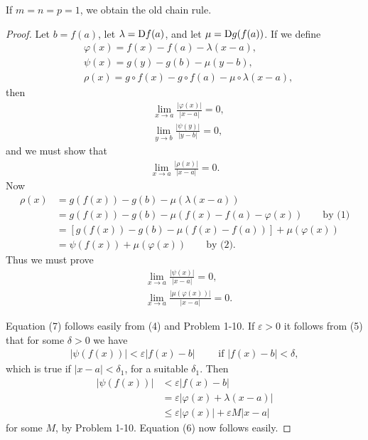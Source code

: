 If $m=n=p=1$, we obtain the old chain rule.
\begin{proof}
    Let $b = f(a)$, let $\lambda = \mathrm{D}f(a)$, and let $\mu = \mathrm{D}g(f(a))$.
    If we define 
    \begin{align}
        & \varphi(x) = f(x) - f(a) - \lambda(x-a), \\
        & \psi(x) = g(y) - g(b) - \mu(y-b),\\
        & \rho(x) = g\circ f(x) - g\circ f(a) - \mu\circ \lambda(x-a),
    \end{align}
    then 
    \begin{align}
        & \lim_{x\to a}{\frac{|\varphi(x)|}{|x-a|}} = 0,\\
        & \lim_{y\to b}{\frac{|\psi(y)|}{|y-b|}} = 0,
    \end{align}
    and we must show that 
    \begin{align*}
        \lim_{x\to a}{\frac{|\rho(x)|}{|x-a|}} = 0.
    \end{align*}\relax
    Now 
    \begin{align*}
        \rho(x) 
        & = g(f(x)) - g(b) - \mu(\lambda(x-a)) \\
        & = g(f(x)) - g(b) -\mu(f(x) - f(a) - \varphi(x)) \qquad{\text{by (1)}} \\
        & = \left[g(f(x)) - g(b) - \mu(f(x) - f(a))\right] + \mu(\varphi(x)) \\
        & = \psi(f(x)) + \mu(\varphi(x))  \qquad{\text{by (2)}}.
    \end{align*}\relax 
    Thus we must prove
    \begin{align}
        & \lim_{x\to a}{\frac{|\psi(x)|}{|x-a|}} = 0, \\
        & \lim_{x\to a}{\frac{|\mu(\varphi(x))|}{|x-a|}} = 0.
    \end{align}

    Equation (7) follows easily from (4) and Problem 1-10. If $\varepsilon>0$ it follows
    from (5) that for some $\delta >0$ we have 
    \begin{align*}
        \left|\psi(f(x))\right| < \varepsilon|f(x) - b| \qquad \text{ if } |f(x)-b|<\delta,
    \end{align*}\relax 
    which is true if $|x-a| < \delta_1$, for a suitable $\delta_1$. Then 
    \begin{align*}
        \left|\psi(f(x))\right| 
        & < \varepsilon|f(x)- b| \\
        & = \varepsilon|\varphi(x) + \lambda(x-a)| \\
        & \le \varepsilon|\varphi(x)| + \varepsilon M|x-a|
    \end{align*} 
    for some $M$, by Problem 1-10. Equation (6) now follows easily.
\end{proof}


